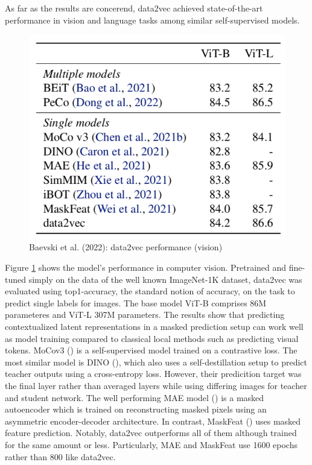 \documentclass[
]{krantz}
\begin{document}
As far as the results are concerend, data2vec achieved state-of-the-art performance in vision and language tasks among similar self-supervised models.

\begin{figure}

{\centering \includegraphics[width=0.5\linewidth]{figures/05-chapter2/datavecresultsone} 

}

\caption{Baevski et al. (2022): data2vec performance (vision)}\label{fig:data2vecresults1}
\end{figure}

Figure \ref{fig:data2vecresults1} shows the model's performance in computer vision.
Pretrained and fine-tuned simply on the data of the well known ImageNet-1K dataset,
data2vec was evaluated using top1-accuracy, the standard notion of accuracy, on the task to
predict single labels for images. The base model ViT-B comprises 86M parameteres and ViT-L 307M parameters. The results show that predicting contextualized latent representations in a masked
prediction setup can work well as model training compared to classical local methods such as predicting visual tokens.
MoCov3 (\citet{chen2021empirical}) is a self-supervised model trained on a contrastive loss. The most similar model is DINO (\citet{caron2021emerging}), which also uses a self-destillation setup to predict teacher outputs using a cross-entropy loss. However, their predicition target was the final layer rather than averaged layers while using differing images for teacher and student network. The well performing MAE model (\citet{he2022masked}) is a masked autoencoder which is trained on reconstructing masked pixels using an asymmetric encoder-decoder architecture. In contrast, MaskFeat (\citet{wei2022masked}) uses masked feature prediction. Notably, data2vec outperforms all of them although trained for the same amount or less. Particularly, MAE and MaskFeat use 1600 epochs rather than 800 like data2vec.
\end{document}
